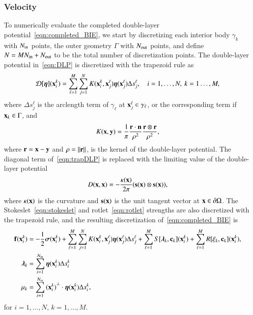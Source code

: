\documentclass[preprint, 10pt]{elsarticle}
\begin{document}
\subsubsection{Velocity}
To numerically evaluate the completed double-layer
potential~\eqref{eqn:completed_BIE}, we start by discretizing each
interior body $\gamma_k$ with $N_{\mathrm{in}}$ points, the outer geometry
$\Gamma$ with $N_{\mathrm{out}}$ points, and define $N = MN_{\mathrm{in}} + N_{\mathrm{out}}$ to be
the total number of discretization points.  The double-layer potential
in~\eqref{eqn:DLP} is discretized with the trapezoid rule as
\begin{align}
  {\mathcal{D}}[{\boldsymbol\eta}]({\mathbf{x}}_i^k) = \sum_{\ell = 1}^{M}\sum_{j=1}^{N} 
    K({\mathbf{x}}_i^k,{\mathbf{x}}_j^\ell) {\boldsymbol\eta}({\mathbf{x}}_j^\ell) 
      \Delta s_{j}^{\ell}, \quad i=1,\ldots,N, \: k=1\ldots,M,
  \label{eqn:trapDLP}
\end{align}
where $\Delta s_j^\ell$ is the arclength term of $\gamma_\ell$ at
${\mathbf{x}}_j^\ell \in \gamma_\ell$, or the corresponding term if ${\mathbf{x}}_k \in
\Gamma$, and
\begin{align*}
  K({\mathbf{x}},{\mathbf{y}}) = \frac{1}{\pi} \frac{{\mathbf{r}} \cdot {\mathbf{n}}}{\rho^2} 
      \frac{{\mathbf{r}} \otimes {\mathbf{r}}}{\rho^2},
\end{align*}
where ${\mathbf{r}} = {\mathbf{x}} - {\mathbf{y}}$ and $\rho = \|{\mathbf{r}}\|$, is the kernel of the
double-layer potential.  The diagonal term of~\eqref{eqn:trapDLP} is
replaced with the limiting value of the double-layer potential
\begin{align*}
  D({\mathbf{x}},{\mathbf{x}}) = -\frac{\kappa({\mathbf{x}})}{2\pi}({\mathbf{s}}({\mathbf{x}}) \otimes {\mathbf{s}}({\mathbf{x}})),
\end{align*}
where $\kappa({\mathbf{x}})$ is the curvature and ${\mathbf{s}}({\mathbf{x}})$ is the unit tangent
vector at ${\mathbf{x}} \in {\partial}\Omega$.  The Stokeslet~\eqref{eqn:stokeslet} and
rotlet~\eqref{eqn:rotlet} strengths are also discretized with the
trapezoid rule, and the resulting discretization
of~\eqref{eqn:completed_BIE} is
\begin{equation}
  \label{eqn:completed_BIE_discretized}
  \begin{aligned}
    {\mathbf{f}}({\mathbf{x}}_i^k) &= -\frac{1}{2}{\boldsymbol\sigma}({\mathbf{x}}_i^k) + 
      \sum_{\ell = 1}^{M}\sum_{j=1}^{N} 
      K({\mathbf{x}}_i^k,{\mathbf{x}}_j^\ell) {\boldsymbol\eta}({\mathbf{x}}_j^\ell) \Delta s_{j}^{\ell} +
      \sum_{\ell=1}^M S[{\boldsymbol\lambda}_k,{\mathbf{c}}_k]({\mathbf{x}}_i^k) +
      \sum_{\ell=1}^M R[\xi_k,{\mathbf{c}}_k]({\mathbf{x}}_i^k), \\
    {\boldsymbol\lambda}_k &= \sum_{i=1}^{N_{\mathrm{in}}} {\boldsymbol\eta}({\mathbf{x}}_i^k) 
      \Delta s_i^k \\ 
    \mu_k &= \sum_{i=1}^{N_{\mathrm{in}}} {({\mathbf{x}}_i^k)}^\perp \cdot
      {\boldsymbol\eta}({\mathbf{x}}_i^k) \Delta s_i^k,
  \end{aligned}
\end{equation}
for $i=1,\ldots,N$, $k=1,\ldots,M$.
\end{document}
